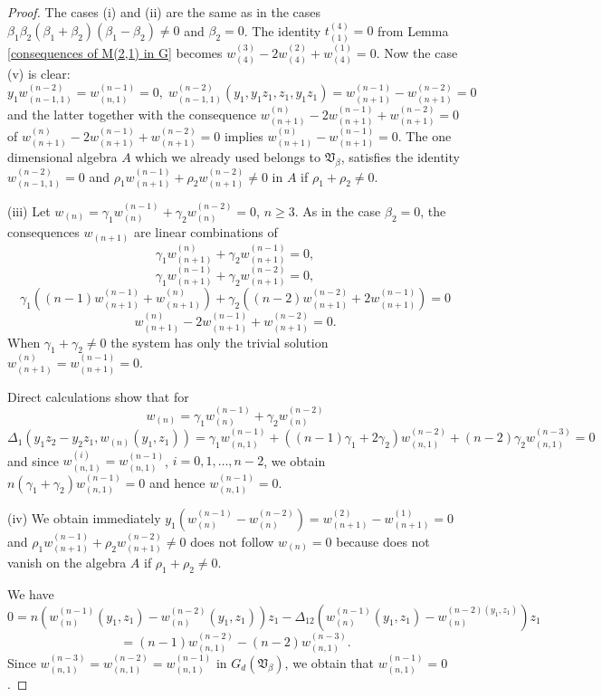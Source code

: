 \documentclass{amsart}
\theoremstyle{definition}
\begin{document}
\begin{proof}
The cases (i) and (ii) are the same as in the cases $\beta_1\beta_2(\beta_1+\beta_2)(\beta_1-\beta_2)\not=0$ and $\beta_2=0$.
The identity $t^{(4)}_{(1)}=0$ from Lemma \ref{consequences of M(2,1) in G} becomes
$w_{(4)}^{(3)}-2w_{(4)}^{(2)}+w_{(4)}^{(1)}=0$.
Now the case (v) is clear:
\[
y_1w_{(n-1,1)}^{(n-2)}=w_{(n,1)}^{(n-1)}=0,\;w_{(n-1,1)}^{(n-2)}(y_1,y_1z_1,z_1,y_1z_1)=w_{(n+1)}^{(n-1)}-w_{(n+1)}^{(n-2)}=0
\]
and the latter together with the consequence $w_{(n+1)}^{(n)}-2w_{(n+1)}^{(n-1)}+w_{(n+1)}^{(n-2)}=0$ of $w_{(n+1)}^{(n)}-2w_{(n+1)}^{(n-1)}+w_{(n+1)}^{(n-2)}=0$
implies $w_{(n+1)}^{(n)}-w_{(n+1)}^{(n-1)}=0$.
The one dimensional algebra $A$ which we already used belongs to ${\mathfrak V}_{\beta}$, satisfies the identity $w_{(n-1,1)}^{(n-2)}=0$
and $\rho_1w_{(n+1)}^{(n-1)}+\rho_2w_{(n+1)}^{(n-2)}\not=0$ in $A$ if $\rho_1+\rho_2\not=0$.

(iii) Let $w_{(n)}=\gamma_1w_{(n)}^{(n-1)}+\gamma_2w_{(n)}^{(n-2)}=0$, $n\geq 3$. As in the case $\beta_2=0$, the consequences $w_{(n+1)}$ are linear combinations of
\[
\gamma_1w_{(n+1)}^{(n)}+\gamma_2w_{(n+1)}^{(n-1)}=0,
\]
\[
\gamma_1w_{(n+1)}^{(n-1)}+\gamma_2w_{(n+1)}^{(n-2)}=0,
\]
\[
\gamma_1((n-1)w_{(n+1)}^{(n-1)}+w_{(n+1)}^{(n)})+\gamma_2((n-2)w_{(n+1)}^{(n-2)}+2w_{(n+1)}^{(n-1)})=0
\]
\[
w_{(n+1)}^{(n)}-2w_{(n+1)}^{(n-1)}+w_{(n+1)}^{(n-2)}=0.
\]
When $\gamma_1+\gamma_2\not=0$ the system has only the trivial solution $w_{(n+1)}^{(n)}=w_{(n+1)}^{(n-1)}=0$.

Direct calculations show that for
\[
w_{(n)}=\gamma_1w_{(n)}^{(n-1)}+\gamma_2w_{(n)}^{(n-2)}
\]
\[
\Delta_1(y_1z_2-y_2z_1,w_{(n)}(y_1,z_1))=\gamma_1w_{(n,1)}^{(n-1)}+((n-1)\gamma_1+2\gamma_2)w_{(n,1)}^{(n-2)}+(n-2)\gamma_2w_{(n,1)}^{(n-3)}=0
\]
and since $w_{(n,1)}^{(i)}=w_{(n,1)}^{(n-1)}$, $i=0,1,\ldots,n-2$, we obtain $n(\gamma_1+\gamma_2)w_{(n,1)}^{(n-1)}=0$ and hence $w_{(n,1)}^{(n-1)}=0$.

(iv) We obtain immediately $y_1(w_{(n)}^{(n-1)}-w_{(n)}^{(n-2)})=w_{(n+1)}^{(2)}-w_{(n+1)}^{(1)}=0$ and
$\rho_1w_{(n+1)}^{(n-1)}+\rho_2w_{(n+1)}^{(n-2)}\not=0$ does not follow $w_{(n)}=0$ because does not vanish on the algebra $A$ if $\rho_1+\rho_2\not=0$.

We have
\[
0=n(w_{(n)}^{(n-1)}(y_1,z_1)-w_{(n)}^{(n-2)}(y_1,z_1))z_1-\Delta_{12}(w_{(n)}^{(n-1)}(y_1,z_1)-w_{(n)}^{(n-2)(y_1,z_1)})z_1
\]
\[
=(n-1)w_{(n,1)}^{(n-2)}-(n-2)w_{(n,1)}^{(n-3)}.
\]
Since $w_{(n,1)}^{(n-3)}=w_{(n,1)}^{(n-2)}=w_{(n,1)}^{(n-1)}$ in $G_d({\mathfrak V}_{\beta})$, we obtain that $w_{(n,1)}^{(n-1)}=0$.
\end{proof}
\end{document}
